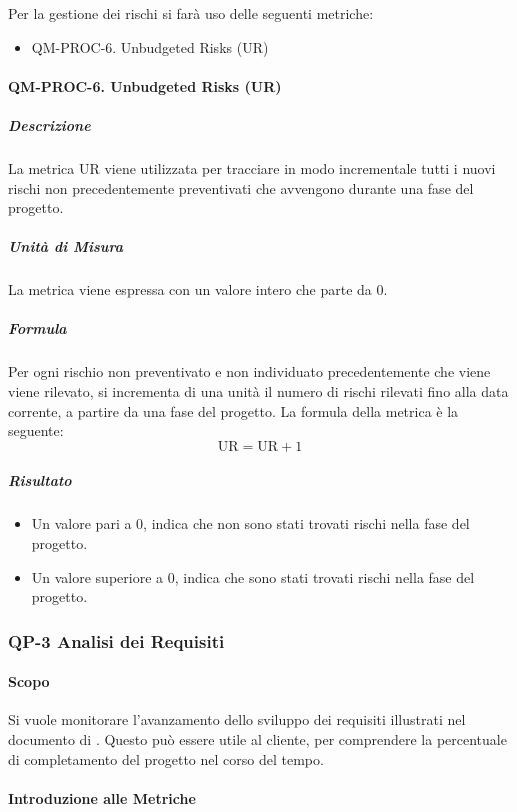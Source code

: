 		Per la gestione dei rischi si farà uso delle seguenti metriche:

		\begin{itemize}
			\item QM-PROC-6. Unbudgeted Risks (UR)
		\end{itemize}

		\paragraph{QM-PROC-6. Unbudgeted Risks (UR)}

			\subparagraph{Descrizione}
			La metrica UR viene utilizzata per tracciare in modo incrementale tutti i nuovi rischi non precedentemente preventivati che avvengono durante una fase del progetto.

			\subparagraph{Unità di Misura}
			La metrica viene espressa con un valore intero che parte da 0.

			\subparagraph{Formula}
			Per ogni rischio non preventivato e non individuato precedentemente che viene viene rilevato, si incrementa di una unità il numero di rischi rilevati fino alla data corrente, a partire da una fase del progetto.
			La formula della metrica è la seguente:
			\[
				\text{UR} = \text{UR} + 1
			\]

			\subparagraph{Risultato}
			\begin{itemize}
				\item Un valore pari a 0, indica che non sono stati trovati rischi nella fase del progetto.
				\item Un valore superiore a 0, indica che sono stati trovati rischi nella fase del progetto.
			\end{itemize}

	\subsubsection{QP-3 Analisi dei Requisiti}

		\paragraph{Scopo}

		Si vuole monitorare l'avanzamento dello sviluppo dei requisiti illustrati nel documento di . Questo può essere utile al cliente, per comprendere la percentuale di completamento del progetto nel corso del tempo.

		\paragraph{Introduzione alle Metriche}

